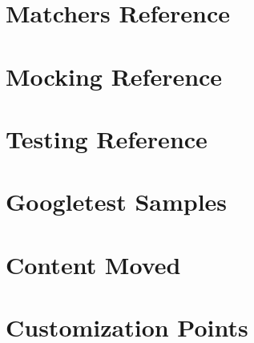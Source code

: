 \let\mypdfximage\pdfximage\def\pdfximage{\immediate\mypdfximage}\documentclass[twoside]{book}
\newcommand{\+}{\discretionary{\mbox{\scriptsize$\hookleftarrow$}}{}{}}
\begin{document}
\chapter{Matchers Reference}
\label{md__home_mary_VegaProgramEngineering_2024_build__deps_googletest-src_docs_reference_matchers}

\chapter{Mocking Reference}
\label{md__home_mary_VegaProgramEngineering_2024_build__deps_googletest-src_docs_reference_mocking}

\chapter{Testing Reference}
\label{md__home_mary_VegaProgramEngineering_2024_build__deps_googletest-src_docs_reference_testing}

\chapter{Googletest Samples}
\label{md__home_mary_VegaProgramEngineering_2024_build__deps_googletest-src_docs_samples}

\chapter{Content Moved}
\label{md__home_mary_VegaProgramEngineering_2024_build__deps_googletest-src_googlemock_docs_README}

\chapter{Customization Points}
\label{md__home_mary_VegaProgramEngineering_2024_build__deps_googletest-src_googlemock_include_gmock_internal_custom_README}

\end{document}
